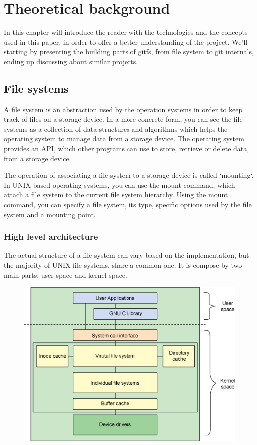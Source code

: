 \chapter{Theoretical background}

\label{ch:theoretical}
In this chapter will introduce the reader with the technologies and the concepts used in this paper, in order to offer a better understanding of the project. We'll starting by presenting the building parts of gitfs, from file system to git internals, ending up discussing about similar projects. 

\section{File systems}
    A file system is an abstraction used by the operation systems in order to keep track of files on a storage device. In a more concrete form, you can see the file systems as a collection of data structures and algorithms which helps the operating system to manage data from a storage device. The operating system provides an API, which other programs can use to store, retrieve or delete data, from a storage device.
    
    The operation of associating a file system to a storage device is called `mounting`. In UNIX based operating systems, you can use the mount command, which attach a file system to the current file system hierarchy. Using the mount command, you can specify a file system, its type, specific options used by the file system and a mounting point.

    \subsection{High level architecture}
        The actual structure of a file system can vary based on the implementation, but the majority of UNIX file systems, share a common one. It is compose by two main parts: user space and kernel space. 

        \begin{figure}[h]
           \begin{center}
               \includegraphics[width=15cm]{theoretical/filesystem-arhitecture.png}
            \end{center}
        \end{figure}

